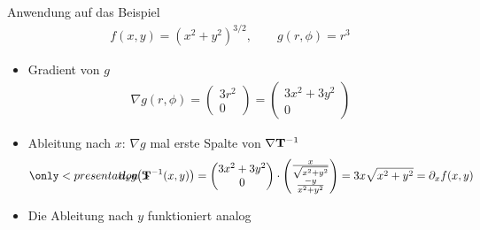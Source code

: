 \begin{frame}{Anwendung auf das Beispiel}
  \begin{gather*}
    f(x,y) = \left(x^2+y^2\right)^{3/2},\qquad g(r,\phi) = r^3
  \end{gather*}
  \begin{itemize}
  \item Gradient von $g$
    \begin{gather*}
      \nabla g(r,\phi) =
      \begin{pmatrix}
        3r^2\\ 0
      \end{pmatrix}
      =
      \begin{pmatrix}
        3x^2+3y^2\\0
      \end{pmatrix}
    \end{gather*}
  \item Ableitung nach $x$: $\nabla g$ mal erste Spalte von $\nabla \mathbf{T}^{-1}$
    \begin{gather*}
      \only<presentation>{\hspace{-3em}}
      d_x g\bigl(\vT^{-1}(x,y)\bigr) =
      \begin{pmatrix}
        3x^2+3y^2\\0
      \end{pmatrix}\cdot
      \begin{pmatrix}
        \frac x{\sqrt{x^2+y^2}}\\
        \frac {-y}{x^2+y^2}
      \end{pmatrix} = 3x\sqrt{x^2+y^2} = \partial_x f(x,y)
    \end{gather*}
    \pause
  \item Die Ableitung nach $y$ funktioniert analog
  \end{itemize}  
\end{frame}


